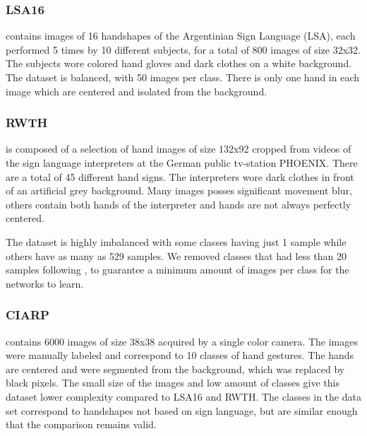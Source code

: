 \subsubsection{LSA16} \cite{Ronchetti2016} contains images of 16 handshapes of the Argentinian Sign Language (LSA), each performed 5 times by 10 different subjects, for a total of 800 images of size 32x32. The subjects wore colored hand gloves and dark clothes on a white background. The dataset is balanced, with 50 images per class. There is only one hand in each image which are centered and isolated from the background.

\subsubsection{RWTH} \cite{koller16:deephand} is composed of a selection of  hand images of size 132x92 cropped from  videos of the sign language interpreters at the German public tv-station PHOENIX. There are a total of 45 different hand signs. The interpreters wore dark clothes in front of an artificial grey background. Many images posses significant movement blur,  others contain both hands of the interpreter and hands are not always perfectly centered.

The dataset is highly imbalanced with some classes having just 1 sample while others have as many as 529 samples. We removed classes that had less than 20 samples following \cite{quiroga2017study}, to guarantee a minimum amount of images per class for the networks to learn.

\subsubsection{CIARP} \cite{ciarp2018} contains 6000 images of size 38x38 acquired by a single color camera. The images were manually labeled and correspond to 10 classes of hand gestures. The hands are centered and were segmented from the background, which was replaced by black pixels. The small size of the images and low amount of classes give this dataset lower complexity compared to LSA16 and RWTH.  The classes in the data set correspond to handshapes  not based on sign language, but are similar enough  that the comparison remains valid.

